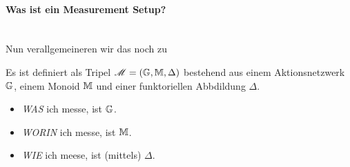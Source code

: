 \paragraph{Was ist ein Measurement Setup?}\mylinebreak\\
Nun verallgemeineren wir das noch zu
\begin{definition}
    Es ist definiert als Tripel $\operatorname{\mathscr M} = (\mathbb{G}, \mathbb{M}, \Delta)$ bestehend aus einem Aktionsnetzwerk $\mathbb{G}$, einem Monoid $\mathbb{M}$ und einer funktoriellen Abbdildung $\Delta$.
\end{definition}
\begin{remark}
    \begin{itemize}
        \item \emph{WAS} ich messe, ist $\mathbb{G}$.
        \item \emph{WORIN} ich messe, ist $\mathbb{M}$.
        \item \emph{WIE} ich meese, ist (mittels) $\Delta$.
    \end{itemize}
\end{remark}
